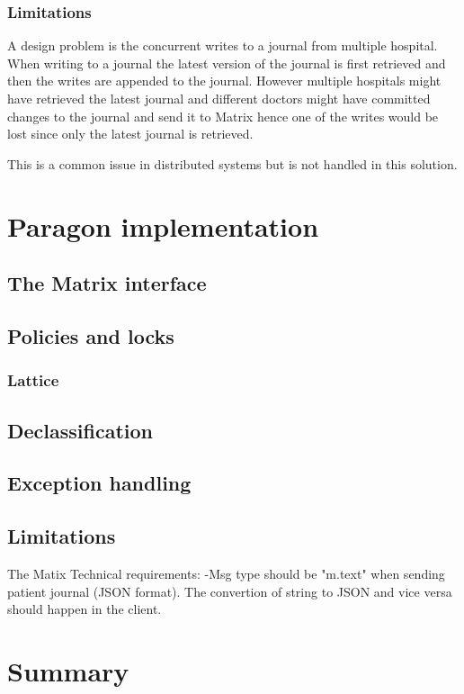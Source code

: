 \subsubsection{Limitations}

A design problem is the concurrent writes to a journal from multiple hospital. When writing to a journal the latest version of the journal is first retrieved and then the writes are appended to the journal. However multiple hospitals might have retrieved the latest journal and different doctors might have committed changes to the journal and send it to Matrix hence one of the writes would be lost since only the latest journal is retrieved.

This is a common issue in distributed systems but is not handled in this solution.




\section{Paragon implementation}

\subsection{The Matrix interface}


\subsection{Policies and locks}


\subsubsection{Lattice}

\subsection{Declassification}

\subsection{Exception handling}


\subsection{Limitations}

The Matix 
Technical requirements:
-Msg type should be "m.text" when sending patient journal (JSON format). The convertion of string to JSON and vice versa should happen in the client.

\section{Summary}